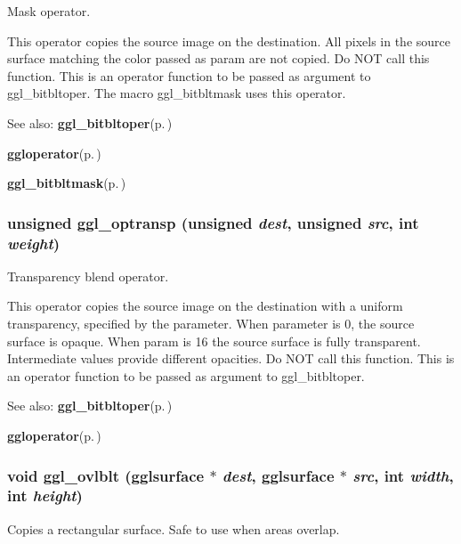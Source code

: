 Mask operator. 

This operator copies the source image on the destination. All pixels in the source surface matching the color passed as param are not copied. Do NOT call this function. This is an operator function to be passed as argument to ggl\_\-bitbltoper. The macro ggl\_\-bitbltmask uses this operator.

\begin{Desc}
\item[See also:]{\bf ggl\_\-bitbltoper}{\rm (p.\,\pageref{ggl_8h_a27})} 

{\bf ggloperator}{\rm (p.\,\pageref{ggl_8h_a8})} 

{\bf ggl\_\-bitbltmask}{\rm (p.\,\pageref{ggl_8h_a6})} \end{Desc}
\subsubsection{\setlength{\rightskip}{0pt plus 5cm}unsigned ggl\_\-optransp (unsigned {\em dest}, unsigned {\em src}, int {\em weight})}\label{ggl_8h_a31}


Transparency blend operator. 

This operator copies the source image on the destination with a uniform transparency, specified by the parameter. When parameter is 0, the source surface is opaque. When param is 16 the source surface is fully transparent. Intermediate values provide different opacities. Do NOT call this function. This is an operator function to be passed as argument to ggl\_\-bitbltoper.

\begin{Desc}
\item[See also:]{\bf ggl\_\-bitbltoper}{\rm (p.\,\pageref{ggl_8h_a27})} 

{\bf ggloperator}{\rm (p.\,\pageref{ggl_8h_a8})} \end{Desc}
\subsubsection{\setlength{\rightskip}{0pt plus 5cm}void ggl\_\-ovlblt ({\bf gglsurface} $\ast$ {\em dest}, {\bf gglsurface} $\ast$ {\em src}, int {\em width}, int {\em height})}\label{ggl_8h_a21}


Copies a rectangular surface. Safe to use when areas overlap. 

